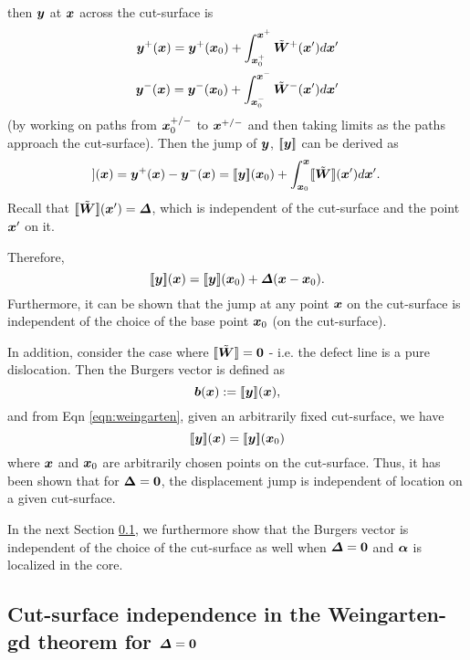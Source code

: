 \documentclass[11pt,letterpaper]{article}
\begin{document}
then $\bfy$ at $\bfx$ across the cut-surface is 
\begin{eqnarray*}
\bfy^+(\bfx) = \bfy^+(\bfx_0) + \int_{\bfx_0^+}^{\bfx^+} \tilde{\bfW}^+(\bfx')d\bfx' \\
\bfy^-(\bfx) = \bfy^-(\bfx_0) + \int_{\bfx_0^-}^{\bfx^-} \tilde{\bfW}^-(\bfx')d\bfx'
\end{eqnarray*}
(by working on paths from $\bfx_0^{+/-}$ to $\bfx^{+/-}$ and then taking limits as the paths approach the cut-surface). Then the jump of $\bfy$, $[\![\bfy]\!]$ can be derived as 
\begin{eqnarray*}
[\![\bfy]\!](\bfx) = \bfy^{+}(\bfx)  - \bfy^{-}(\bfx) 
= [\![\bfy]\!](\bfx_0) + \int_{\bfx_0}^{\bfx} [\![\tilde{\bfW}]\!](\bfx')d\bfx'.
\end{eqnarray*} 
Recall that $[\![\tilde{\bfW}]\!](\bfx') = \bfDelta$, which is independent of the cut-surface and the point $\bfx'$ on it.

Therefore,
\begin{equation}\label{eqn:weingarten}
[\![\bfy]\!](\bfx) = [\![\bfy]\!](\bfx_0) + \bfDelta (\bfx-\bfx_0).
\end{equation} 
Furthermore, it can be shown that the jump at any point $\bfx$ on the cut-surface is independent of the choice of the base point $\bfx_0$ (on the cut-surface).

In addition, consider the case where $[\![\tilde{\bfW}]\!] = \bf0$ - i.e. the defect line is a pure dislocation. Then the Burgers vector is defined as 
\begin{equation*}
\bfb(\bfx) := [\![\bfy]\!](\bfx),
\end{equation*}
and from Eqn \ref{eqn:weingarten}, given an arbitrarily fixed cut-surface, we have
\begin{equation}\label{weingarten_jump}
[\![\bfy]\!](\bfx) = [\![\bfy]\!](\bfx_0)
\end{equation}
where $\bfx$ and $\bfx_0$ are arbitrarily chosen points on the cut-surface. Thus, it has been shown that for $\bf\Delta = \bf0$, the  displacement jump is independent of location on a given cut-surface. 

In the next Section \ref{sec:cut_independ}, we furthermore show that the Burgers vector is independent of the choice of the cut-surface as well when $\bfDelta = \bf0$ and $\bfalpha$ is localized in the core.


\subsection{Cut-surface independence in the Weingarten-gd theorem for $\bfDelta = \bf0$} \label{sec:cut_independ}
\end{document}
